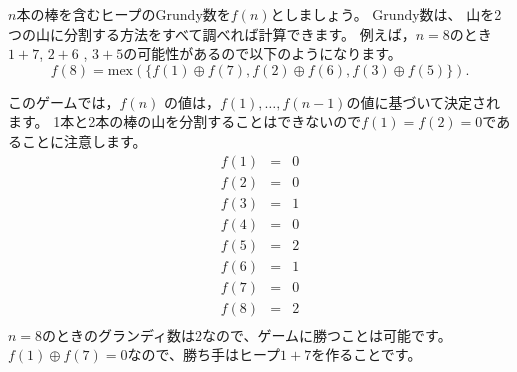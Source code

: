 $n$本の棒を含むヒープのGrundy数を$f (n)$としましょう。
Grundy数は、
山を2つの山に分割する方法をすべて調べれば計算できます。
例えば，$n = 8$のとき$1+7$, $2+6$ , $3+5$の可能性があるので以下のようになります。
\[f(8)=\textrm{mex}(\{f(1) \oplus f(7), f(2) \oplus f(6), f(3) \oplus f(5)\}).\]

このゲームでは，$f (n)$ の値は，$f(1),\ldots,f(n-1)$の値に基づいて決定されます。
1本と2本の棒の山を分割することはできないので$f(1)=f(2)=0$であることに注意します。
\[
\begin{array}{lcl}
f(1) & = & 0 \\
f(2) & = & 0 \\
f(3) & = & 1 \\
f(4) & = & 0 \\
f(5) & = & 2 \\
f(6) & = & 1 \\
f(7) & = & 0 \\
f(8) & = & 2 \\
\end{array}
\]
$n=8$のときのグランディ数は2なので、ゲームに勝つことは可能です。
$f(1) \oplus f(7) = 0$なので、勝ち手はヒープ$1+7$を作ることです。